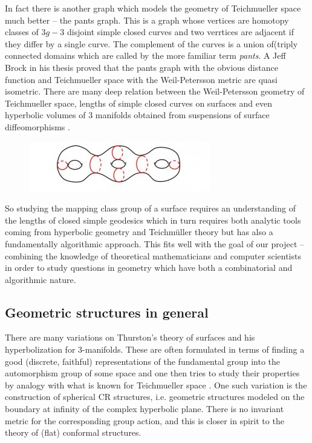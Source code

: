 \documentclass[14pt,fleqn]{article}
\begin{document}
In fact there is another graph which models the geometry of Teichmueller space much better -- the pants graph. This is a graph whose vertices are homotopy classes of
$3g-3$ disjoint simple closed curves    and two verrtices are adjacent if they differ by a single curve.
The complement of the curves is a union of(triply connected domains which are called by the more familiar term \textit{pants}. A Jeff Brock in his thesis proved that the pants graph with the obvious distance function and Teichmueller space with the Weil-Petersson metric are quasi isometric.
There are many deep relation between the 
Weil-Petersson geometry of Teichmueller space, lengths of simple closed curves on surfaces and even hyperbolic volumes of 3 manifolds obtained from  suspensions of surface diffeomorphisms \cite{km-nevvp-18}. 

 \begin{figure}[H]
\begin{center}
\includegraphics[scale=1.2]{Pair-pants-2-300x82.jpg} 
\end{center}
\end{figure}


So studying the mapping class group of a surface 
requires 
an understanding 
of the lengths of closed simple geodesics
which in turn 
requires both analytic tools
coming from hyperbolic geometry and Teichmüller theory 
but has also a fundamentally
algorithmic approach.
This fits well with the  goal of our project -- combining the knowledge of theoretical
mathematicians and computer scientists in order to study questions in
geometry
which have both a combinatorial and algorithmic nature.  





\subsection{Geometric structures in general}

There are many variations
 on Thurston's theory of surfaces and his
 hyperbolization for 3-manifolds.
 These are often formulated in terms 
 of finding a good (discrete, faithful) 
 representations of the fundamental group
 into the automorphism group of some space
 and one then tries to study their properties by analogy with what is known 
 for Teichmueller space \cite{anne-19}.
 One such variation  is the construction of
spherical CR structures, 
i.e. geometric structures modeled on the
boundary at infinity of the complex hyperbolic plane. There is no
invariant metric for the corresponding group action, and this is
closer in spirit to the theory of (flat) conformal structures.
\end{document}
